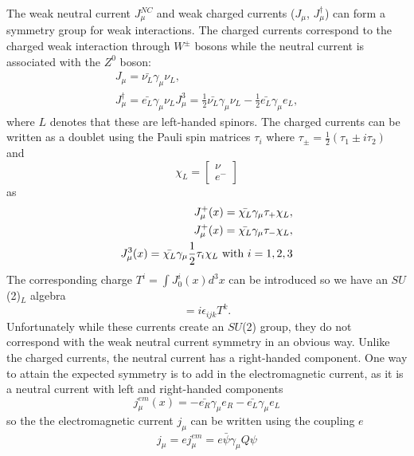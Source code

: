 The weak neutral current $J_\mu^{NC}$ and weak charged currents ($J_\mu$, $J_\mu^\dagger$) can form a symmetry group for weak interactions. The charged currents correspond to the charged weak interaction through $W^\pm$ bosons while the neutral current is associated with the $Z^0$ boson:
\begin{equation}
\begin{split}
J_\mu=\bar{\nu_L}\gamma_\mu\nu_L, \\
J_\mu^\dagger =\bar{e_L}\gamma_\mu\nu_L
J_\mu^3=\frac{1}{2}\bar{\nu_L}\gamma_\mu\nu_L-\frac{1}{2}\bar{e_L}\gamma_\mu e_L,
\end{split}
\end{equation}
where $L$ denotes that these are left-handed spinors. The charged currents can be written as a doublet using the Pauli spin matrices $\tau_i$ where $\tau_\pm=\frac{1}{2}(\tau_1\pm i\tau_2)$ and
\begin{equation}
\chi_L=\begin{bmatrix}
        \nu  \\
        e^-
        \end{bmatrix}
\end{equation}
as 
\begin{equation}
\begin{split}
J_\mu^+(x)=\bar{\chi_L}\gamma_\mu\tau_+\chi_L, \\
J_\mu^+(x)=\bar{\chi_L}\gamma_\mu\tau_-\chi_L, \\
J_\mu^3(x)=\bar{\chi_L}\gamma_\mu\frac{1}{2}\tau_i\chi_L \textnormal{ with } i=1,2,3
\end{split}
\end{equation}
The corresponding charge $T^i=\int J_0^i(x)d^3x$ can be introduced so we have an $SU$(2)$_L$ algebra
\begin{equation}
[T^i,T^j]=i\epsilon_{ijk}T^k.
\end{equation}
Unfortunately while these currents create an $SU$(2) group, they do not correspond with the weak neutral current symmetry in an obvious way. Unlike the charged currents, the neutral current has a right-handed component. One way to attain the expected symmetry is to add in the electromagnetic current, as it is a neutral current with left and right-handed components
\begin{equation} 
j_\mu^{em}(x)=-\bar{e_R}\gamma_\mu e_R-\bar{e_L}\gamma_\mu e_L
\end{equation}
so the the electromagnetic current $j_\mu$ can be written using the coupling $e$
\begin{equation}
j_\mu=e j_\mu^{em} = e\bar{\psi}\gamma_\mu Q\psi
\end{equation}
